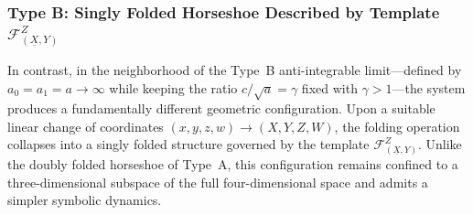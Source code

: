 \documentclass[12pt]{iopart}
\begin{document}
\subsubsection{Type B: Singly Folded Horseshoe Described by Template \( \mathcal{F}^Z_{(\underline{X},Y)} \)}
\label{Type B}

In contrast, in the neighborhood of the Type~B anti-integrable limit—defined by \( a_0 = a_1 = a \to \infty \) while keeping the ratio \( c/\sqrt{a} = \gamma \) fixed with \( \gamma > 1 \)—the system produces a fundamentally different geometric configuration. Upon a suitable linear change of coordinates \( (x,y,z,w) \to (X,Y,Z,W) \), the folding operation collapses into a singly folded structure governed by the template \( \mathcal{F}^Z_{(\underline{X},Y)} \). Unlike the doubly folded horseshoe of Type~A, this configuration remains confined to a three-dimensional subspace of the full four-dimensional space and admits a simpler symbolic dynamics.
\end{document}
